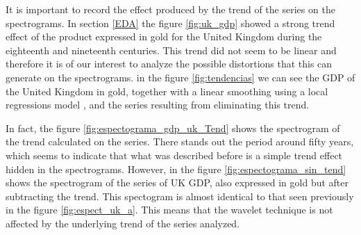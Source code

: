 \documentclass[a4paper]{article}
\begin{document}
It is important to record the effect produced by the trend of the series on the spectrograms. In section \ref{EDA} the figure \ref{fig:uk_gdp} showed a strong trend effect of the product expressed in gold for the United Kingdom during the eighteenth and nineteenth centuries. This trend did not seem to be linear and therefore it is of our interest to analyze the possible distortions that this can generate on the spectrograms. in the figure \ref{fig:tendencias} we can see the GDP of the United Kingdom in gold, together with a linear smoothing using a local regressions model \citep{Shyu1992}, and the series resulting from eliminating this trend.

In fact, the figure \ref{fig:espectograma_gdp_uk_Tend} shows the spectrogram of the trend calculated on the series. There stands out the period around fifty years, which seems to indicate that what was described before is a simple trend effect hidden in the spectrograms. However, in the figure \ref{fig:espectograma_sin_tend} shows the spectrogram of the series of UK GDP, also expressed in gold but after subtracting the trend. This spectogram is almost identical to that seen previously in the figure \ref{fig:espect_uk_a}. This means that the wavelet technique is not affected by the underlying trend of the series analyzed.
\end{document}
